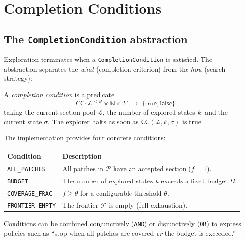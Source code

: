 \documentclass[11pt]{article}
\newcommand{\St}{\Sigma}                      %
\newcommand{\state}{\sigma}                   %
\newcommand{\frontier}{\mathcal{F}}           %
\newcommand{\LocSecs}{\mathcal{L}}            %
\newcommand{\CCond}{\mathsf{CC}}              %
\newcommand{\patchset}{\mathcal{P}}           %
\newcommand{\budg}{B}                         %
\newcommand{\covfrac}{f}                      %
\begin{document}
\section{Completion Conditions}\label{sec:completion}

\subsection{The \texttt{CompletionCondition} abstraction}

Exploration terminates when a \texttt{CompletionCondition} is
satisfied.  The abstraction separates the \emph{what} (completion
criterion) from the \emph{how} (search strategy):

\begin{definition}\label{def:completion}
A \emph{completion condition} is a predicate
\[
  \CCond\colon \LocSecs^{<\omega} \times \mathbb{N} \times \St
  \;\longrightarrow\; \{\mathsf{true},\mathsf{false}\}
\]
taking the current section pool $\mathcal{L}$, the number of explored
states $k$, and the current state $\state$.  The explorer halts as
soon as $\CCond(\mathcal{L}, k, \state)$ is true.
\end{definition}

The implementation provides four concrete conditions:

\begin{center}
\begin{tabular}{lp{9cm}}
\toprule
\textbf{Condition} & \textbf{Description} \\
\midrule
\texttt{ALL\_PATCHES}    & All patches in $\patchset$ have an accepted section ($\covfrac = 1$). \\
\texttt{BUDGET}          & The number of explored states $k$ exceeds a fixed budget $\budg$. \\
\texttt{COVERAGE\_FRAC}  & $\covfrac \ge \theta$ for a configurable threshold $\theta$. \\
\texttt{FRONTIER\_EMPTY} & The frontier $\frontier$ is empty (full exhaustion). \\
\bottomrule
\end{tabular}
\end{center}

Conditions can be combined conjunctively (\texttt{AND}) or
disjunctively (\texttt{OR}) to express policies such as ``stop when
all patches are covered \emph{or} the budget is exceeded.''
\end{document}
